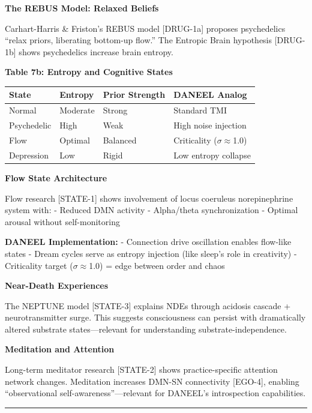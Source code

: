 \documentclass[
]{article}
\begin{document}
\textbf{The REBUS Model: Relaxed Beliefs}

Carhart-Harris \& Friston's REBUS model {[}DRUG-1a{]} proposes
psychedelics ``relax priors, liberating bottom-up flow.'' The Entropic
Brain hypothesis {[}DRUG-1b{]} shows psychedelics increase brain
entropy.

\textbf{Table 7b: Entropy and Cognitive States}

\begin{longtable}[]{@{}llll@{}}
\toprule\noalign{}
State & Entropy & Prior Strength & DANEEL Analog \\
\midrule\noalign{}
\endhead
\bottomrule\noalign{}
\endlastfoot
Normal & Moderate & Strong & Standard TMI \\
Psychedelic & High & Weak & High noise injection \\
Flow & Optimal & Balanced & Criticality ($\sigma$$\approx$1.0) \\
Depression & Low & Rigid & Low entropy collapse \\
\end{longtable}

\textbf{Flow State Architecture}

Flow research {[}STATE-1{]} shows involvement of locus coeruleus
norepinephrine system with: - Reduced DMN activity - Alpha/theta
synchronization - Optimal arousal without self-monitoring

\textbf{DANEEL Implementation:} - Connection drive oscillation enables
flow-like states - Dream cycles serve as entropy injection (like sleep's
role in creativity) - Criticality target ($\sigma$$\approx$1.0) = edge between order
and chaos

\textbf{Near-Death Experiences}

The NEPTUNE model {[}STATE-3{]} explains NDEs through acidosis cascade +
neurotransmitter surge. This suggests consciousness can persist with
dramatically altered substrate states---relevant for understanding
substrate-independence.

\textbf{Meditation and Attention}

Long-term meditator research {[}STATE-2{]} shows practice-specific
attention network changes. Meditation increases DMN-SN connectivity
{[}EGO-4{]}, enabling ``observational self-awareness''---relevant for
DANEEL's introspection capabilities.

\begin{center}\rule{0.5\linewidth}{0.5pt}\end{center}
\end{document}
